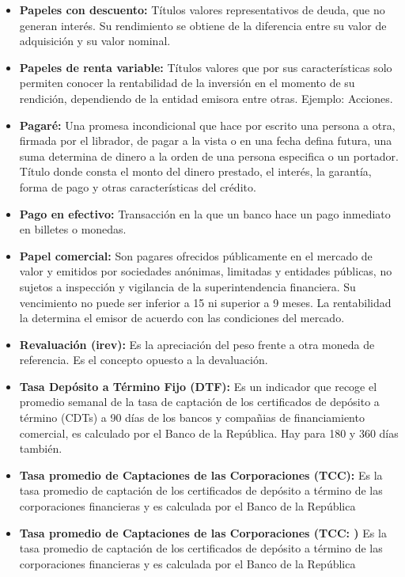 \begin{itemize}
\item {\textbf{Papeles con descuento: }}
Títulos valores representativos de deuda, que no generan interés. Su rendimiento se obtiene de la diferencia entre su valor de adquisición y su valor nominal.
\\
\item {\textbf{Papeles de renta variable: }}
Títulos valores que por sus características solo permiten conocer la rentabilidad de la inversión en el momento de su rendición, dependiendo de la entidad emisora entre otras. Ejemplo: Acciones.
\\
\item {\textbf{Pagaré: }}
Una promesa incondicional que hace por escrito una persona a otra, firmada por el librador, de pagar a la vista o en una fecha defina futura, una suma determina de dinero a la orden de una persona especifica o un portador.
\\
Título donde consta el monto del dinero prestado, el interés, la garantía, forma de pago y otras características del crédito.
\\
\item {\textbf{Pago en efectivo: }}
Transacción en la que un banco hace un pago inmediato en billetes o monedas.
\\
\item {\textbf{Papel comercial: }}
Son pagares ofrecidos públicamente en el mercado de valor y emitidos por sociedades anónimas, limitadas y entidades públicas, no sujetos a inspección y vigilancia de la superintendencia financiera. Su vencimiento no puede ser inferior a 15 ni superior a 9 meses. La rentabilidad la determina el emisor de acuerdo con las condiciones del mercado.

\item {\textbf{Revaluación (irev): }}
Es la apreciación del peso frente a otra moneda de referencia. Es el concepto opuesto a la devaluación.\\

\item {\textbf{Tasa Depósito a Término Fijo (DTF): }}
Es un indicador que recoge el promedio semanal de la tasa de captación de los certificados de depósito a término (CDTs) a 90 días de los bancos y compañias de financiamiento comercial, es calculado por el Banco de la República. Hay para 180 y 360 días también. \\


\item  {\textbf{Tasa promedio de Captaciones de las Corporaciones (TCC): }}
Es la tasa promedio de captación de los certificados de depósito a término de las corporaciones financieras y es calculada por el Banco de la República\\

\item {\textbf{Tasa promedio de Captaciones de las Corporaciones (TCC: )}}
Es la tasa promedio de captación de los certificados de depósito a término de las corporaciones financieras y es calculada por el Banco de la República\\

\end{itemize}
